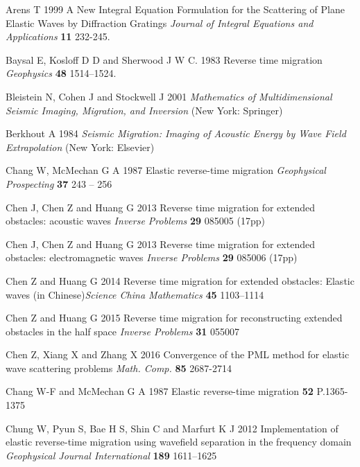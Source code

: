 \documentclass[12pt]{iopart}
\begin{document}
{\begin{thebibliography}{99}
	Arens T 1999 {A New Integral Equation Formulation for the Scattering of Plane Elastic Waves by Diffraction Gratings} {\it Journal of Integral Equations and Applications} {\bf 11} 232-245.
	
	Baysal E, Kosloff D D and Sherwood J W C. 1983 {Reverse time migration} {\it Geophysics} {\bf 48} 1514--1524.
	
	Bleistein N, Cohen J and Stockwell J 2001 {\em Mathematics of Multidimensional Seismic Imaging, Migration, and Inversion} (New York: Springer)
	
	{Berkhout A}  1984 {\em Seismic Migration: Imaging of Acoustic Energy by Wave Field Extrapolation}  (New York: Elsevier)
	
	Chang W, McMechan G A 1987 {Elastic reverse-time migration} {\it Geophysical Prospecting} {\bf 37} 
	243 -- 256 
	
	Chen J,  Chen Z and  Huang G 2013 {Reverse time migration for extended obstacles: acoustic waves}  {\it Inverse Problems} {\bf 29}  085005 (17pp)
	
	Chen J,  Chen Z and  Huang G 2013 {Reverse time migration for extended obstacles: electromagnetic waves} {\it Inverse Problems}
	{\bf 29} 085006 (17pp)
	
	Chen Z  and  Huang G 2014 {Reverse time migration for extended obstacles: Elastic waves} (in Chinese){\it Science China Mathematics} {\bf 45} 1103--1114
	
	
	Chen Z and Huang G 2015 {Reverse time migration for reconstructing extended obstacles in the half space}  {\it Inverse Problems} {\bf 31 }  055007 
	
	Chen Z, Xiang X and Zhang X 2016 {Convergence of the PML method for elastic wave scattering problems}  {\it Math. Comp.} {\bf 85}  2687-2714
	
	Chang W-F and McMechan G A 1987 Elastic reverse-time migration {\bf 52} P.1365-1375
	
	Chung W, Pyun S, Bae H S, Shin C and Marfurt K J 2012 {Implementation of elastic reverse-time migration using wavefield separation in the frequency domain} {\it Geophysical Journal International} {\bf 189} 1611--1625
	

\end{thebibliography}}
\end{document}
